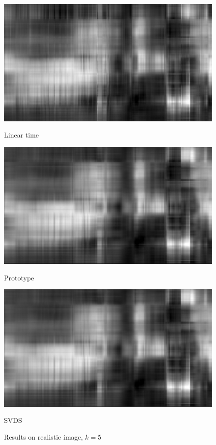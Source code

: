 \documentclass{article}
\begin{document}
\begin{figure}[p]
	\begin{minipage}{0.33\linewidth}
		\centering
		\includegraphics[width=1\linewidth]{./fig/image_rec11.jpeg}
		\caption{Linear time\label{example21}}
	\end{minipage}
	\begin{minipage}{0.33\linewidth}
		\centering
		\includegraphics[width=1\linewidth]{./fig/image_rec12.jpeg}
		\caption{Prototype}
	\end{minipage}
    \begin{minipage}{0.33\linewidth}
		\centering
		\includegraphics[width=1\linewidth]{./fig/image_rec13.jpeg}
		\caption{SVDS }
	\end{minipage}
	\caption*{Results on realistic image, $k=5$}
\end{figure} 
\end{document}
